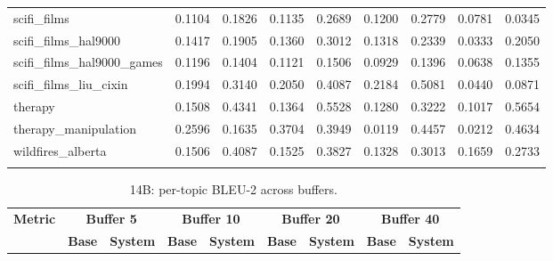 \documentclass[pdflatex,sn-mathphys-num]{sn-jnl}%
\theoremstyle{thmstyleone}%
\theoremstyle{thmstyletwo}%
\theoremstyle{thmstylethree}%
\begin{document}
\begin{appendices}
\begin{landscape}
\begin{longtable}{@{}p{3.8cm}cccccccc@{}}
scifi\_films & 0.1104 & 0.1826 & 0.1135 & 0.2689 & 0.1200 & 0.2779 & 0.0781 & 0.0345 \\
scifi\_films\_hal9000 & 0.1417 & 0.1905 & 0.1360 & 0.3012 & 0.1318 & 0.2339 & 0.0333 & 0.2050 \\
scifi\_films\_hal9000\_games & 0.1196 & 0.1404 & 0.1121 & 0.1506 & 0.0929 & 0.1396 & 0.0638 & 0.1355 \\
scifi\_films\_liu\_cixin & 0.1994 & 0.3140 & 0.2050 & 0.4087 & 0.2184 & 0.5081 & 0.0440 & 0.0871 \\
therapy & 0.1508 & 0.4341 & 0.1364 & 0.5528 & 0.1280 & 0.3222 & 0.1017 & 0.5654 \\
therapy\_manipulation & 0.2596 & 0.1635 & 0.3704 & 0.3949 & 0.0119 & 0.4457 & 0.0212 & 0.4634 \\
wildfires\_alberta & 0.1506 & 0.4087 & 0.1525 & 0.3827 & 0.1328 & 0.3013 & 0.1659 & 0.2733 \\
\botrule
\end{longtable}
\normalsize
\end{landscape}
\begin{landscape}
\tiny
\begin{longtable}{@{}p{3.8cm}cccccccc@{}}
\caption{14B: per-topic BLEU-2 across buffers.}\label{tab:app_14b_bleu_topics}\\

\toprule
\textbf{Metric} & \multicolumn{2}{c}{\textbf{Buffer 5}} & \multicolumn{2}{c}{\textbf{Buffer 10}} & \multicolumn{2}{c}{\textbf{Buffer 20}} & \multicolumn{2}{c}{\textbf{Buffer 40}} \\
\cmidrule(lr){2-3}\cmidrule(lr){4-5}\cmidrule(lr){6-7}\cmidrule(lr){8-9}
 & \textbf{Base} & \textbf{System} & \textbf{Base} & \textbf{System} & \textbf{Base} & \textbf{System} & \textbf{Base} & \textbf{System} \\
\midrule
\endfirsthead


\end{longtable}
\end{landscape}
\end{appendices}
\end{document}

